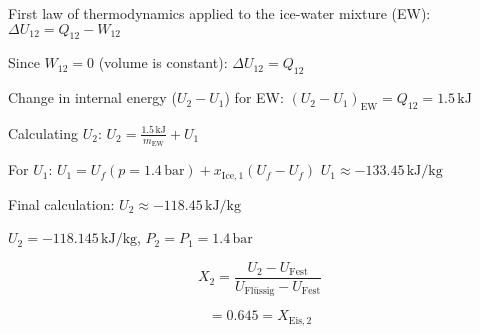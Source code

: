 First law of thermodynamics applied to the ice-water mixture (EW):  
\( \Delta U_{12} = Q_{12} - W_{12} \)  

Since \( W_{12} = 0 \) (volume is constant):  
\( \Delta U_{12} = Q_{12} \)  

Change in internal energy (\( U_2 - U_1 \)) for EW:  
\( (U_2 - U_1)_{\text{EW}} = Q_{12} = 1.5 \, \text{kJ} \)  

Calculating \( U_2 \):  
\( U_2 = \frac{1.5 \, \text{kJ}}{m_{\text{EW}}} + U_1 \)  

For \( U_1 \):  
\( U_1 = U_f(p = 1.4 \, \text{bar}) + x_{\text{Ice},1}(U_f - U_f) \)  
\( U_1 \approx -133.45 \, \text{kJ/kg} \)  

Final calculation:  
\( U_2 \approx -118.45 \, \text{kJ/kg} \)

\( U_2 = -118.145 \, \text{kJ/kg} \), \( P_2 = P_1 = 1.4 \, \text{bar} \)  

\[
X_2 = \frac{U_2 - U_{\text{Fest}}}{U_{\text{Flüssig}} - U_{\text{Fest}}}
\]

\[
= 0.645 = X_{\text{Eis},2}
\]